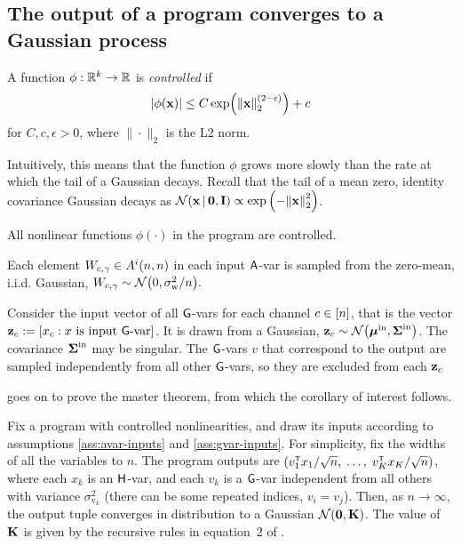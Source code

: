{\subsection{The output of a \Netsor program converges to a Gaussian process}
\begin{definition}
  A function $\phi: \mathbb{R}^k \to \mathbb{R}$ is \emph{controlled} if
  \[ \abs{\phi(\vx)} \le C\, \text{exp} \bra{\bracket{\|}{\|}{\vx}_2^\bra{2-\epsilon}}
    + c \]
  for 
  $C,c,\epsilon > 0$, where $\|\cdot\|_2$ is the L2 norm.\end{definition}

Intuitively, this means that the function $\phi$ grows
more slowly than the rate at which the tail of a Gaussian decays. Recall that the tail of a
mean zero, identity covariance Gaussian decays as 
$\mathcal{N}\bra{\vx \vbar {\boldsymbol{0}}, \eye} \propto \exp\bra{-\bracket{\|}{\|}{\vx}_2^2}$.

\begin{assumption}
  All nonlinear functions $\phi(\cdot)$ in the \Netsor program are controlled.
  \label{ass:controlled}
\end{assumption}

\begin{assumption}
  Each element $W_{c,\gamma} \in A^i(n, n)$ in each input $\mathsf{A}$-var is
  sampled from the zero-mean, i.i.d. Gaussian, $W_{\chan,\prevchan} \sim \NormDist{0,
    \sigma_\text{w}^2/n}.$
  \label{ass:avar-inputs}
\end{assumption}
\begin{assumption}
  Consider the input vector of all $\mathsf{G}$-vars for each channel $c \in [n]$,
  that is the vector $\mathbf{z}_c := [x_c : x\text{ is input
  }\mathsf{G}\text{-var}]$. It is drawn from a Gaussian, $\vz_\chan \sim
  \NormDist{\vmu^\text{in}, \vSigma^\text{in}}$.
  The covariance $\boldsymbol{\Sigma}^\text{in}$ may be
  singular. The $\mathsf{G}$-vars $v$ that correspond to the output are sampled
  independently from all other $\mathsf{G}$-vars, so they are excluded from each $\mathbf{z}_c$
  \label{ass:gvar-inputs}
\end{assumption}

\citet{yang2019wide} goes on to prove the \Netsor master theorem, from which
the corollary of interest follows.

\begin{corollary}
  Fix a \Netsor program with controlled nonlinearities, and draw its inputs
  according to assumptions \ref{ass:avar-inputs} and \ref{ass:gvar-inputs}. For simplicity, fix
  the widths of all the variables to $n$. The program outputs are $(v_{1}^\tp x_1/\sqrt{n}, \;\dots, \; v_K^\tp
  x_K/\sqrt{n})$, where
  each $x_k$ is an $\mathsf{H}$-var, and each
    $v_k$ is a $\mathsf{G}$-var independent from all others with variance
    $\sigma^2_{\text{v}_k}$ (there can be some repeated indices, $v_i = v_j$).
  Then, as $n \to \infty$, the output tuple
  converges in distribution to a Gaussian $\NormDist{{\boldsymbol{0}}, \vK}$.
  The value of $\mathbf{K}$ is given by the recursive rules in equation~2 of \citet{yang2019wide}.
  \label{corollary:netsor-gp}
\end{corollary}

}
